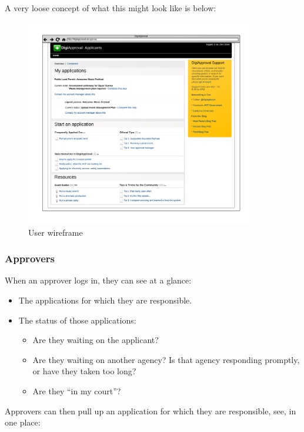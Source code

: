 \documentclass[12pt,a4paper,twosided]{article}
\begin{document}
A very loose concept of what this might look like is below:

\begin{figure}[htbp]
\centering
\includegraphics[width=0.9\textwidth]{./imgs/user-wireframe.png}
\caption{User wireframe}
\end{figure}

\subsubsection{Approvers}\label{approvers}

When an approver logs in, they can see at a glance:

\begin{itemize}
\itemsep1pt\parskip0pt
\item
  The applications for which they are responsible.
\item
  The status of those applications:

  \begin{itemize}
  \itemsep1pt\parskip0pt
  \item
    Are they waiting on the applicant?
  \item
    Are they waiting on another agency? Is that agency responding
    promptly, or have they taken too long?
  \item
    Are they ``in my court''?
  \end{itemize}
\end{itemize}

Approvers can then pull up an application for which they are
responsible, see, in one place:
\end{document}
